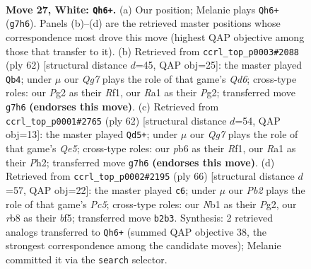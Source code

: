 \documentclass[11pt]{article}
\begin{document}
\clearpage

\begin{figure}[p]\centering
\begin{subfigure}{0.46\textwidth}\centering
\resizebox{\linewidth}{!}{%
\newchessgame
\chessboard[
  setfen={1r5r/6Qp/1p2k3/p4b2/7P/8/PP3PP1/RN4K1 w - - 1 27},
  showmover=false,
  pgfstyle=straightmove, color=movearrow, markmove={g7-h6}
]}
\caption{}
\end{subfigure}\hfill
\begin{subfigure}{0.46\textwidth}\centering
\resizebox{\linewidth}{!}{%
\newchessgame
\chessboard[
  setfen={2rr4/5kb1/3Qp2p/PP1b2p1/8/8/5PPP/5RK1 w - - 1 32},
  showmover=false,
  pgfstyle=straightmove, color=movearrow, markmove={d6-b4}
]}
\caption{}
\end{subfigure}
\\[4pt]
\begin{subfigure}{0.46\textwidth}\centering
\resizebox{\linewidth}{!}{%
\newchessgame
\chessboard[
  setfen={2q3k1/p1r4p/1p6/4Q3/2P5/4p1P1/PP1b3P/5RK1 w - - 0 32},
  showmover=false,
  pgfstyle=straightmove, color=movearrow, markmove={e5-d5}
]}
\caption{}
\end{subfigure}\hfill
\begin{subfigure}{0.46\textwidth}\centering
\resizebox{\linewidth}{!}{%
\newchessgame
\chessboard[
  setfen={4r1k1/5p1p/6pB/1pP1rb2/3Q4/6P1/6PK/8 w - - 2 34},
  showmover=false,
  pgfstyle=straightmove, color=movearrow, markmove={c5-c6}
]}
\caption{}
\end{subfigure}
\caption{\textbf{Move 27, White: \texttt{Qh6+}.} (a) Our position; Melanie plays \texttt{Qh6+} (\texttt{g7h6}). Panels (b)--(d) are the retrieved master positions whose correspondence most drove this move (highest QAP objective among those that transfer to it). (b) Retrieved from \texttt{ccrl\_top\_p0003\#2088} (ply 62) [structural distance $d$=45, QAP obj=25]: the master played \texttt{Qb4}; under $\mu$ our \emph{Qg7} plays the role of that game's \emph{Qd6}; cross-type roles: our \emph{P}g2 as their \emph{R}f1, our \emph{R}a1 as their \emph{P}g2; transferred move \texttt{g7h6} \textbf{(endorses this move)}. (c) Retrieved from \texttt{ccrl\_top\_p0001\#2765} (ply 62) [structural distance $d$=54, QAP obj=13]: the master played \texttt{Qd5+}; under $\mu$ our \emph{Qg7} plays the role of that game's \emph{Qe5}; cross-type roles: our \emph{p}b6 as their \emph{R}f1, our \emph{R}a1 as their \emph{P}h2; transferred move \texttt{g7h6} \textbf{(endorses this move)}. (d) Retrieved from \texttt{ccrl\_top\_p0002\#2195} (ply 66) [structural distance $d$=57, QAP obj=22]: the master played \texttt{c6}; under $\mu$ our \emph{Pb2} plays the role of that game's \emph{Pc5}; cross-type roles: our \emph{N}b1 as their \emph{P}g2, our \emph{r}b8 as their \emph{b}f5; transferred move \texttt{b2b3}. Synthesis: 2 retrieved analogs transferred to \texttt{Qh6+} (summed QAP objective 38, the strongest correspondence among the candidate moves); Melanie committed it via the \texttt{search} selector.}
\label{fig:thought-m52}
\end{figure}
\end{document}
